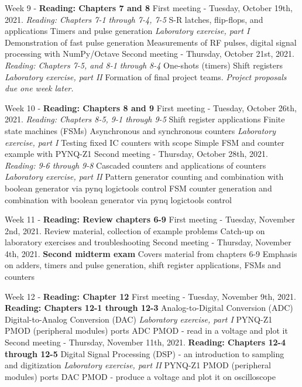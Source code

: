\documentclass[10pt]{article}
\begin{document}
\begin{outline}[enumerate]
\1 Week 9 - \textbf{Reading: Chapters 7 and 8}
\2 First meeting - Tuesday, October 19th, 2021. \textit{Reading: Chapters 7-1 through 7-4, 7-5}
\3 S-R latches, flip-flops, and applications
\3 Timers and pulse generation
\3 \textit{Laboratory exercise, part I}
\4 Demonstration of fast pulse generation
\4 Measurements of RF pulses, digital signal processing with NumPy/Octave
\2 Second meeting - Thursday, October 21st, 2021. \textit{Reading: Chapters 7-5, and 8-1 through 8-4}
\3 One-shots (timers)
\3 Shift registers
\3 \textit{Laboratory exercise, part II}
\4 Formation of final project teams.  \textit{Project proposals due one week later.}

\1 Week 10 - \textbf{Reading: Chapters 8 and 9}
\2 First meeting - Tuesday, October 26th, 2021. \textit{Reading: Chapters 8-5, 9-1 through 9-5}
\3 Shift register applications
\3 Finite state machines (FSMs)
\3 Asynchronous and synchronous counters
\3 \textit{Laboratory exercise, part I}
\4 Testing fixed IC counters with scope
\4 Simple FSM and counter example with PYNQ-Z1
\2 Second meeting - Thursday, October 28th, 2021. \textit{Reading: 9-6 through 9-8}
\3 Cascaded counters and applications of counters
\3 \textit{Laboratory exercise, part II}
\4 Pattern generator counting and combination with boolean generator via pynq logictools control
\4 FSM counter generation and combination with boolean generator via pynq logictools control

\1 Week 11 - \textbf{Reading: Review chapters 6-9}
\2 First meeting - Tuesday, November 2nd, 2021.
\3 Review material, collection of example problems
\3 Catch-up on laboratory exercises and troubleshooting
\2 Second meeting - Thursday, November 4th, 2021.
\3 \textbf{Second midterm exam}
\4 Covers material from chapters 6-9
\4 Emphasis on adders, timers and pulse generation, shift register applications, FSMs and counters

\1 Week 12 - \textbf{Reading: Chapter 12}
\2 First meeting - Tuesday, November 9th, 2021. \textbf{Reading: Chapters 12-1 through 12-3}
\3 Analog-to-Digital Conversion (ADC)
\3 Digital-to-Analog Conversion (DAC)
\3 \textit{Laboratory exercise, part I}
\4 PYNQ-Z1 PMOD (peripheral modules) ports
\4 ADC PMOD - read in a voltage and plot it
\2 Second meeting - Thursday, November 11th, 2021. \textbf{Reading: Chapters 12-4 through 12-5}
\3 Digital Signal Processing (DSP) - an introduction to sampling and digitization
\3 \textit{Laboratory exercise, part II}
\4 PYNQ-Z1 PMOD (peripheral modules) ports
\4 DAC PMOD - produce a voltage and plot it on oscilloscope


\end{outline}
\end{document}
